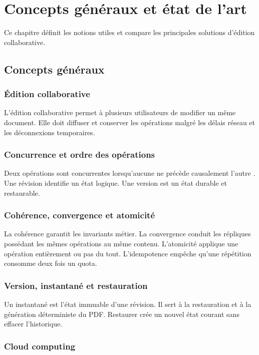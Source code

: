 \chapter{Concepts généraux et état de l'art}

Ce chapitre définit les notions utiles et compare les principales solutions d'édition collaborative.

\section{Concepts généraux}

\subsection{Édition collaborative}

L'édition collaborative permet à plusieurs utilisateurs de modifier un même document. Elle doit diffuser et conserver les opérations malgré les délais réseau et les déconnexions temporaires.

\subsection{Concurrence et ordre des opérations}

Deux opérations sont concurrentes lorsqu'aucune ne précède causalement l'autre \cite{lamport1978}. Une révision identifie un état logique. Une version est un état durable et restaurable.

\subsection{Cohérence, convergence et atomicité}

La cohérence garantit les invariants métier. La convergence conduit les répliques possédant les mêmes opérations au même contenu. L'atomicité applique une opération entièrement ou pas du tout. L'idempotence empêche qu'une répétition consomme deux fois un quota.

\subsection{Version, instantané et restauration}

Un instantané est l'état immuable d'une révision. Il sert à la restauration et à la génération déterministe du PDF. Restaurer crée un nouvel état courant sans effacer l'historique.

\subsection{Cloud computing}

